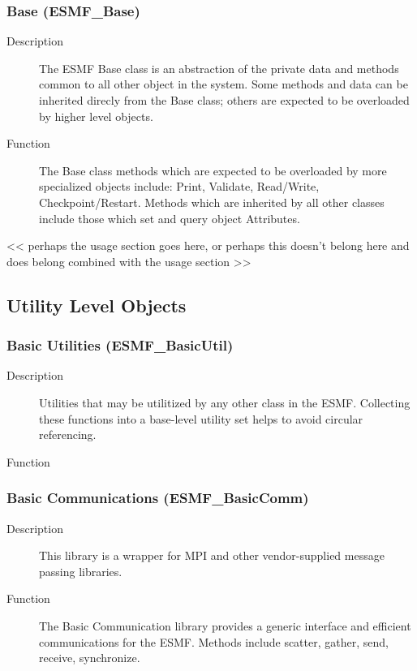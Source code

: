 \subsubsection{Base (ESMF\_Base)}
\label{sec:Base} 
\begin{description}
\item [Description] The ESMF Base class is an abstraction of the private data and
methods common to all other object in the system.  Some methods and data can be
inherited direcly from the Base class; others are expected to be overloaded by
higher level objects.
\item [Function] The Base class methods which are expected to be overloaded by
more specialized objects include: Print, Validate, Read/Write, Checkpoint/Restart.
Methods which are inherited by all other classes include those which 
set and query object Attributes.
\end{description}

<< perhaps the usage section goes here, or perhaps this doesn't
belong here and does belong combined with the usage section >>

\subsection{Utility Level Objects}

\subsubsection{Basic Utilities (ESMF\_BasicUtil)} 
\begin{description}
\item [Description] Utilities that may be utilitized by any other class in the ESMF.  
Collecting these functions into a base-level utility set helps to 
avoid circular referencing.
\item [Function] 
\end{description}

\subsubsection{Basic Communications (ESMF\_BasicComm)}
\begin{description}
\item [Description] This library is a wrapper for MPI and other vendor-supplied 
message passing libraries.
\item [Function] The Basic Communication library provides a generic interface
and efficient communications for the ESMF.  Methods include scatter, gather, send,
receive, synchronize. 
\end{description}

